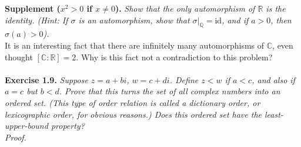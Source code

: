 \documentclass{article}
\begin{document}
\textbf{Supplement ($x^2 > 0$ if $x \neq 0$).}
\emph{Show that the only automorphism of $\mathbb{R}$ is the identity.
(Hint: If $\sigma$ is an automorphism, show that $\sigma|_{\mathbb{Q}} = \text{id}$,
and if $a > 0$, then $\sigma(a) > 0$).} \\

It is an interesting fact that there are infinitely many automorphisms of $\mathbb{C}$,
even thought $[\mathbb{C}:\mathbb{R}] = 2$.
Why is this fact not a contradiction to this problem? \\\\






\textbf{Exercise 1.9.}
\emph{Suppose $z = a+bi$, $w = c+di$.
Define $z < w$ if $a < c$, and also if $a = c$ but $b < d$.
Prove that this turns the set of all complex numbers into an ordered set.
(This type of order relation is called a dictionary order,
or lexicographic order, for obvious reasons.)
Does this ordered set have the least-upper-bound property?} \\

\emph{Proof.}
\end{document}
